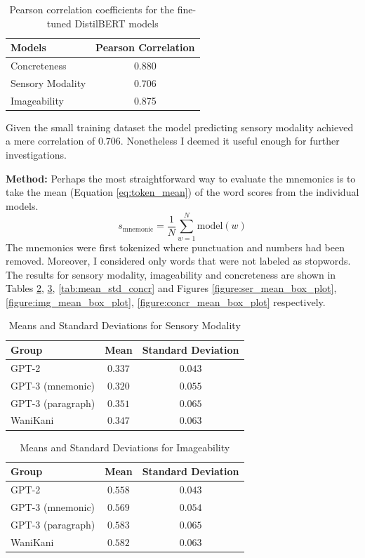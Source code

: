 \begin{table}[ht]
\centering
\begin{tabular}{@{}lc@{}}
\toprule
Models          & Pearson Correlation \\ \midrule
Concreteness             & 0.880                        \\
Sensory Modality         & 0.706                        \\
Imageability             & 0.875                        \\ \bottomrule
\end{tabular}
\caption{Pearson correlation coefficients for the fine-tuned DistilBERT models}
\label{tab:linguistic_features_pearsonr}
\end{table}
Given the small training dataset the model predicting sensory modality achieved a mere correlation of $0.706$. Nonetheless I deemed it useful enough for further investigations.

\textbf{Method:} Perhaps the most straightforward way to evaluate the mnemonics is to take the mean (Equation \ref{eq:token_mean}) of the word scores from the individual models.
\begin{equation} \label{eq:token_mean}
    s_{\text{mnemonic}} = \frac{1}{N}\sum_{w=1}^{N}\text{model}(w)
\end{equation}
The mnemonics were first tokenized where punctuation and numbers had been removed. Moreover, I considered only words that were not labeled as stopwords. The results for sensory modality, imageability and concreteness are shown in Tables \ref{tab:mean_std_ser}, \ref{tab:mean_std_img}, \ref{tab:mean_std_concr} and Figures \ref{figure:ser_mean_box_plot}, \ref{figure:img_mean_box_plot}, \ref{figure:concr_mean_box_plot} respectively.
\begin{table}[ht] 
\centering
\caption{Means and Standard Deviations for Sensory Modality}
\label{table:group_stats}
\begin{tabular}{lcc}
\toprule
Group & Mean & Standard Deviation \\
\midrule
GPT-2& $0.337$ & $0.043$ \\
GPT-3 (mnemonic) & $0.320$ & $0.055$ \\
GPT-3 (paragraph)& $0.351$ & $0.065$ \\
WaniKani & $0.347$ & $0.063$ \\
\bottomrule
\end{tabular}
\label{tab:mean_std_ser}
\end{table}

\begin{table}[ht] 
\centering
\caption{Means and Standard Deviations for Imageability}
\label{table:group_stats}
\begin{tabular}{lcc}
\toprule
Group & Mean & Standard Deviation \\
\midrule
GPT-2& $0.558$ & $0.043$ \\
GPT-3 (mnemonic) & $0.569$ & $0.054$ \\
GPT-3 (paragraph)& $0.583$ & $0.065$ \\
WaniKani & $0.582$ & $0.063$ \\
\bottomrule
\end{tabular}
\label{tab:mean_std_img}
\end{table}

